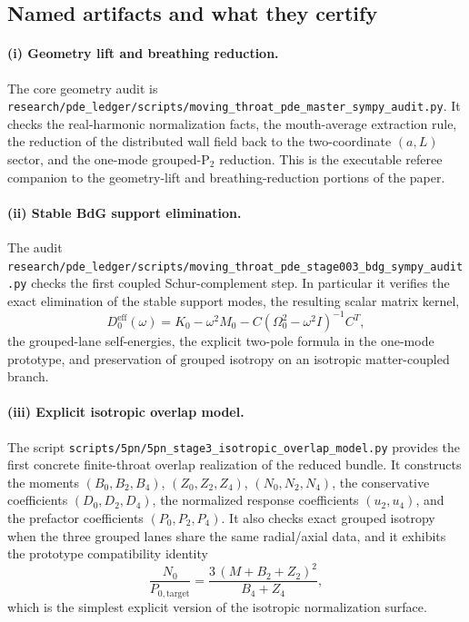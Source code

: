 \documentclass[11pt]{article}
\theoremstyle{definition}
\newcommand{\Ptwo}{\ensuremath{\mathrm{P}_2}}
\newcommand{\eff}{\mathrm{eff}}
\begin{document}
\subsection{Named artifacts and what they certify}

\paragraph{(i) Geometry lift and breathing reduction.}
The core geometry audit is \nolinkurl{research/pde_ledger/scripts/moving_throat_pde_master_sympy_audit.py}. It checks the real-harmonic normalization facts, the mouth-average extraction rule, the reduction of the distributed wall field back to the two-coordinate $(a,L)$ sector, and the one-mode grouped-$\Ptwo$ reduction. This is the executable referee companion to the geometry-lift and breathing-reduction portions of the paper.

\paragraph{(ii) Stable BdG support elimination.}
The audit
\nolinkurl{research/pde_ledger/scripts/moving_throat_pde_stage003_bdg_sympy_audit.py}
checks the first coupled Schur-complement step. In particular it verifies the exact elimination of the stable support modes, the resulting scalar matrix kernel,
\[
 D_0^{\eff}(\omega)=K_0-\omega^2 M_0-C(\Omega_0^2-\omega^2 I)^{-1}C^T,
\]
the grouped-lane self-energies, the explicit two-pole formula in the one-mode prototype, and preservation of grouped isotropy on an isotropic matter-coupled branch.

\paragraph{(iii) Explicit isotropic overlap model.}
The script
\nolinkurl{scripts/5pn/5pn_stage3_isotropic_overlap_model.py}
provides the first concrete finite-throat overlap realization of the reduced bundle. It constructs the moments $(B_0,B_2,B_4)$, $(Z_0,Z_2,Z_4)$, $(N_0,N_2,N_4)$, the conservative coefficients $(D_0,D_2,D_4)$, the normalized response coefficients $(u_2,u_4)$, and the prefactor coefficients $(P_0,P_2,P_4)$. It also checks exact grouped isotropy when the three grouped lanes share the same radial/axial data, and it exhibits the prototype compatibility identity
\[
 \frac{N_0}{P_{0,\mathrm{target}}}
 =
 \frac{3\,(M+B_2+Z_2)^2}{B_4+Z_4},
\]
which is the simplest explicit version of the isotropic normalization surface.
\end{document}
